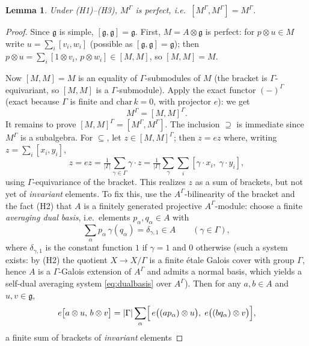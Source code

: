 \documentclass{amsart}
\newtheorem{lemma}{Lemma}
\theoremstyle{definition}
\newcommand{\g}{\mathfrak{g}}
\newcommand{\M}{M}
\begin{document}
\begin{lemma}\label{lem:perfect}
Under \textnormal{(H1)--(H3)}, $\M^\Gamma$ is perfect, i.e.\
$[\M^\Gamma,\M^\Gamma]=\M^\Gamma$.
\end{lemma}
\begin{proof}
Since $\g$ is simple, $[\g,\g]=\g$.  First, $\M=A\otimes\g$ is perfect: for
$p\otimes u\in\M$ write $u=\sum_i[v_i,w_i]$ (possible as $[\g,\g]=\g$); then
$p\otimes u=\sum_i[1\otimes v_i,\,p\otimes w_i]\in[\M,\M]$, so $[\M,\M]=\M$.

Now $[\M,\M]=\M$ is an equality of $\Gamma$-submodules of $\M$ (the bracket
is $\Gamma$-equivariant, so $[\M,\M]$ is a $\Gamma$-submodule).  Apply the
exact functor $(-)^\Gamma$ (exact because $\Gamma$ is finite and
$\mathrm{char}\,k=0$, with projector $e$): we get
\begin{equation}\label{eq:perf1}
\M^\Gamma=[\M,\M]^\Gamma .
\end{equation}
It remains to prove $[\M,\M]^\Gamma=[\M^\Gamma,\M^\Gamma]$.  The inclusion
$\supseteq$ is immediate since $\M^\Gamma$ is a subalgebra.  For
$\subseteq$, let $z\in[\M,\M]^\Gamma$; then $z=ez$ where, writing
$z=\sum_i[x_i,y_i]$,
\[
z=ez=\tfrac1{|\Gamma|}\sum_{\gamma\in\Gamma}\gamma\!\cdot\! z
=\tfrac1{|\Gamma|}\sum_{\gamma}\sum_i[\gamma\!\cdot\!x_i,\;
\gamma\!\cdot\!y_i],
\]
using $\Gamma$-equivariance of the bracket.  This realizes $z$ as a sum of
brackets, but not yet of \emph{invariant} elements.  To fix this, use the
$A^\Gamma$-bilinearity of the bracket and the fact (H2) that $A$ is a
finitely generated projective $A^\Gamma$-module: choose a finite
\emph{averaging dual basis}, i.e.\ elements $p_\alpha,q_\alpha\in A$ with
\begin{equation}\label{eq:dualbasis}
\sum_\alpha p_\alpha\,\gamma(q_\alpha)=\delta_{\gamma,1}\in A
\qquad(\gamma\in\Gamma),
\end{equation}
where $\delta_{\gamma,1}$ is the constant function $1$ if $\gamma=1$ and
$0$ otherwise (such a system exists: by (H2) the quotient $X\to X/\Gamma$
is a finite \'etale Galois cover with group $\Gamma$, hence $A$ is a
$\Gamma$-Galois extension of $A^\Gamma$ and admits a normal basis, which
yields a self-dual averaging system \eqref{eq:dualbasis} over $A^\Gamma$).
Then for any $a,b\in A$ and $u,v\in\g$,
\begin{equation}\label{eq:brkid}
e\bigl[a\otimes u,\,b\otimes v\bigr]
=|\Gamma|\sum_\alpha\Bigl[\,e\bigl((a p_\alpha)\otimes u\bigr),\;
e\bigl((b q_\alpha)\otimes v\bigr)\Bigr],
\end{equation}
a finite sum of brackets of \emph{invariant} elements

\end{proof}
\end{document}
